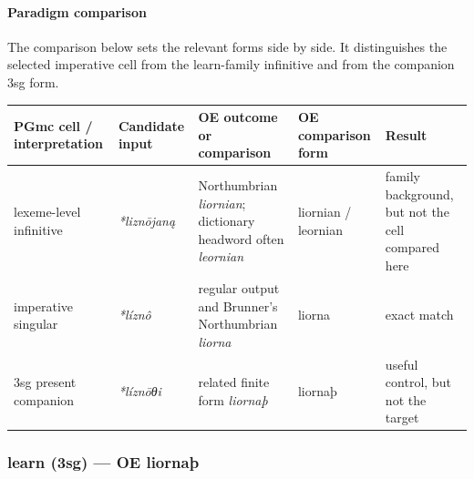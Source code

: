 \documentclass[
  british,
  a4paper,
]{article}
\newcounter{none} %
\begin{document}
\paragraph{Paradigm comparison}\label{paradigm-comparison-22}

The comparison below sets the relevant forms side by side. It
distinguishes the selected imperative cell from the learn-family
infinitive and from the companion 3sg form.

{\def\LTcaptype{none} %
\begin{longtable}[]{@{}
  >{\raggedright\arraybackslash}p{}
  >{\raggedright\arraybackslash}p{}
  >{\raggedright\arraybackslash}p{}
  >{\raggedright\arraybackslash}p{}
  >{\raggedright\arraybackslash}p{}@{}}
\toprule\noalign{}
\begin{minipage}[b]{\linewidth}\raggedright
PGmc cell / interpretation
\end{minipage} & \begin{minipage}[b]{\linewidth}\raggedright
Candidate input
\end{minipage} & \begin{minipage}[b]{\linewidth}\raggedright
OE outcome or comparison
\end{minipage} & \begin{minipage}[b]{\linewidth}\raggedright
OE comparison form
\end{minipage} & \begin{minipage}[b]{\linewidth}\raggedright
Result
\end{minipage} \\
\midrule\noalign{}
\endhead
\bottomrule\noalign{}
\endlastfoot
lexeme-level infinitive & \emph{*liznōjaną} & Northumbrian
\emph{liornian}; dictionary headword often \emph{leornian} & liornian /
leornian & family background, but not the cell compared here \\
imperative singular & \emph{*líznô} & regular output and Brunner's
Northumbrian \emph{liorna} & liorna & exact match \\
3sg present companion & \emph{*líznōθi} & related finite form
\emph{liornaþ} & liornaþ & useful control, but not the target \\
\end{longtable}
}

\subsubsection{learn (3sg) --- OE
liornaþ}\label{learn-3sg-oe-liornauxfe}
\end{document}
